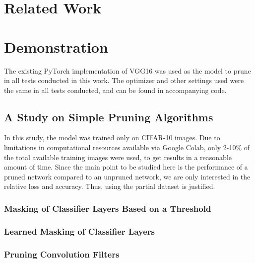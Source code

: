 \documentclass{article}
\begin{document}
\section{Related Work}


\section{Demonstration}

The existing PyTorch implementation of VGG16 was used as the model to prune in all tests conducted in this work. The optimizer and other settings used were the same in all tests conducted, and can be found in accompanying code.

\subsection{A Study on Simple Pruning Algorithms}

In this study, the model was trained only on CIFAR-10 images. Due to limitations in computational resources available via Google Colab, only 2-10\% of the total available training images were used, to get results in a reasonable amount of time. Since the main point to be studied here is the performance of a pruned network compared to an unpruned network, we are only interested in the relative loss and accuracy. Thus, using the partial dataset is justified.

\subsubsection{Masking of Classifier Layers Based on a Threshold}

\subsubsection{Learned Masking of Classifier Layers}

\subsubsection{Pruning Convolution Filters} \label{PruneFilterRes}
\end{document}

